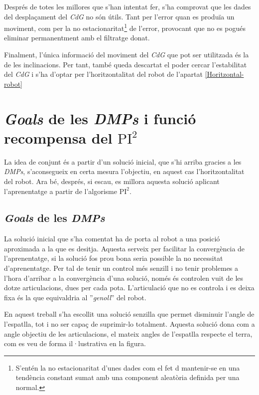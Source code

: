 \documentclass[12pt,a4paper,final,twoside]{report}
\begin{document}
Després de totes les millores que s'han intentat fer, s'ha comprovat que les dades del desplaçament del \textit{CdG} no són útils. Tant per l'error quan es produïa un moviment, com per la no estacionaritat\footnote{S'entén la no estacionaritat d'unes dades com el fet d mantenir-se en una tendència constant sumat amb una component aleatòria definida per una normal.} de l'error, provocant que no es pogués eliminar permanentment amb el filtratge donat.

Finalment, l'única informació del moviment del \textit{CdG} que pot ser utilitzada és la de les inclinacions. Per tant, també queda descartat el poder cercar l'estabilitat del \textit{CdG} i s'ha d'optar per l'horitzontalitat del robot de l'apartat \ref{Horitzontal-robot}



\section{\textit{Goals} de les \textit{DMPs} i funció recompensa del $\mathrm{PI^2}$}

La idea de conjunt és a partir d'un solució inicial, que s'hi arriba gracies a les \textit{DMPs}, s'aconsegueix en certa mesura l'objectiu, en aquest cas l'horitzontalitat del robot. Ara bé, després, si escau, es millora aquesta solució aplicant l'aprenentatge a partir de l'algorisme $\mathrm{PI^2}$.

\subsection{\textit{Goals} de les \textit{DMPs}}

La solució inicial que s'ha comentat ha de porta al robot a una posició aproximada a la que es desitja. Aquesta serveix per facilitar la convergència de l'aprenentatge, si la solució fos prou bona seria possible la no necessitat d'aprenentatge. Per tal de tenir un control més senzill i no tenir problemes a l'hora d'arribar a la convergència d'una solució, només és controlen vuit de les dotze articulacions, dues per cada pota. L'articulació que no es controla i es deixa fixa és la que equivaldria al ''\textit{genoll}'' del robot. 

En aquest treball s'ha escollit una solució senzilla que permet disminuir l'angle de l'espatlla, tot i no ser capaç de suprimir-lo totalment. Aquesta solució dona com a angle objectiu de les articulacions, el mateix angles de l'espatlla respecte el terra, com es veu de forma il·lustrativa en la figura. %
\end{document}
